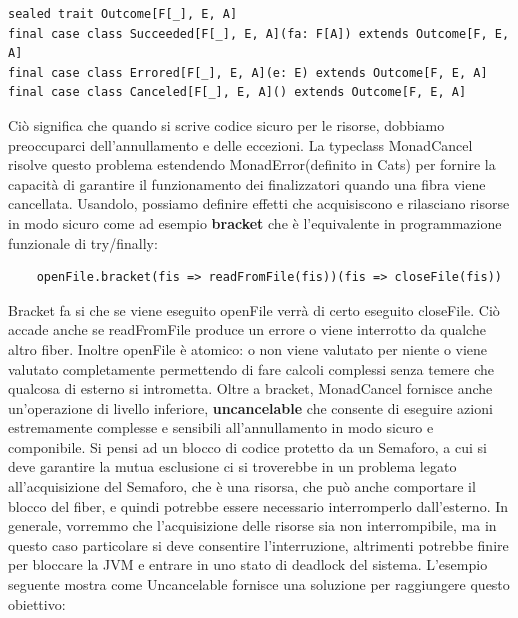 \begin{verbatim}
sealed trait Outcome[F[_], E, A]
final case class Succeeded[F[_], E, A](fa: F[A]) extends Outcome[F, E, A]
final case class Errored[F[_], E, A](e: E) extends Outcome[F, E, A]
final case class Canceled[F[_], E, A]() extends Outcome[F, E, A]    
\end{verbatim}

\noindent Ciò significa che quando si scrive codice sicuro per le risorse, dobbiamo preoccuparci dell'annullamento e delle eccezioni. La typeclass MonadCancel risolve questo problema estendendo MonadError(definito in Cats) per fornire la capacità di garantire il funzionamento dei finalizzatori quando una fibra viene cancellata. Usandolo, possiamo definire effetti che acquisiscono e rilasciano risorse in modo sicuro come ad esempio \textbf{bracket} che è l'equivalente in programmazione funzionale di try/finally:

\begin{verbatim}
    openFile.bracket(fis => readFromFile(fis))(fis => closeFile(fis))
\end{verbatim}

\noindent Bracket fa si che se viene eseguito openFile verrà di certo eseguito closeFile. Ciò accade anche se readFromFile produce un
errore o viene interrotto da qualche altro fiber. Inoltre openFile è atomico: o non viene valutato per niente o viene valutato 
completamente permettendo di fare calcoli complessi senza temere che qualcosa di esterno si intrometta. Oltre a bracket, MonadCancel fornisce anche un'operazione di livello inferiore, \textbf{uncancelable} che consente di eseguire azioni estremamente complesse e sensibili all'annullamento in modo sicuro e componibile. Si pensi ad un blocco di codice protetto da un Semaforo, a cui si deve garantire la mutua esclusione ci si troverebbe in un problema legato all’acquisizione del Semaforo, che è una risorsa, che può anche comportare il blocco del fiber, e quindi potrebbe essere necessario interromperlo dall’esterno. In generale, vorremmo che l’acquisizione delle risorse sia non interrompibile, ma in questo caso particolare si deve consentire l’interruzione, altrimenti potrebbe finire per bloccare la JVM e entrare in uno stato di deadlock del sistema. L'esempio seguente mostra come Uncancelable fornisce una soluzione per raggiungere questo obiettivo:


